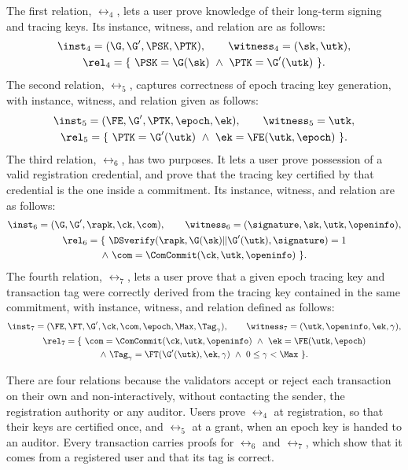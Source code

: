 The first relation, $\rel_4$, lets a user prove knowledge of their long-term
signing and tracing keys. Its instance, witness, and relation are as follows:
%
\begin{gather*}
%
  \inst_4 = (\G, \G', \PSK, \PTK), \qquad \witness_4 = (\sk, \utk), \\
  \rel_4 = \{\ \PSK = \G(\sk) \ \wedge \ \PTK = \G'(\utk)\ \}.
%
\end{gather*}
%
The second relation, $\rel_5$, captures correctness of epoch tracing key
generation, with instance, witness, and relation given as follows:
%
\begin{gather*}
%
  \inst_5 = (\FE, \G', \PTK, \epoch, \ek), \qquad \witness_5 = \utk, \\
  \rel_5 = \{\ \PTK = \G'(\utk) \ \wedge \ \ek = \FE(\utk, \epoch)\ \}.
%
\end{gather*}
%
The third relation, $\rel_6$, has two purposes. It lets a user prove
possession of a valid registration credential, and prove that the tracing key
certified by that credential is the one inside a commitment. Its instance,
witness, and relation are as follows:
%
\begin{gather*}
%
  \inst_6 = (\G, \G', \rapk, \ck, \com), \qquad \witness_6 = (\signature, \sk,
\utk, \openinfo), \\
  \begin{gathered}
  \rel_6 = \{\ \DSverify(\rapk, \G(\sk) \| \G'(\utk), \signature) = 1 \\ \wedge \
\com = \ComCommit(\ck, \utk, \openinfo)\ \}.
  \end{gathered}
%
\end{gather*}
%
The fourth relation, $\rel_7$, lets a user prove that a given epoch tracing key
and transaction tag were correctly derived from the tracing key contained in the
same commitment, with instance, witness, and relation defined as follows:
%
\begin{gather*}
%
  \inst_7 = (\FE, \FT, \G', \ck, \com, \epoch, \Max, \Tag_\gamma), \qquad
\witness_7 = (\utk, \openinfo, \ek, \gamma), \\
  \begin{gathered}
  \rel_7 = \{\ \com = \ComCommit(\ck, \utk, \openinfo) \ \wedge \ \ek =
\FE(\utk, \epoch) \\ \wedge \ \Tag_\gamma = \FT(\G'(\utk), \ek, \gamma) \ \wedge
\ 0 \leq \gamma < \Max\ \}.
  \end{gathered}
%
\end{gather*}

There are four relations because the validators accept or reject each
transaction on their own and non-interactively, without contacting the sender,
the registration authority or any auditor. Users prove $\rel_4$ at
registration, so that their keys are certified once, and $\rel_5$ at a grant,
when an epoch key is handed to an auditor. Every transaction carries proofs for
$\rel_6$ and $\rel_7$, which show that it comes from a registered user and that
its tag is correct.


